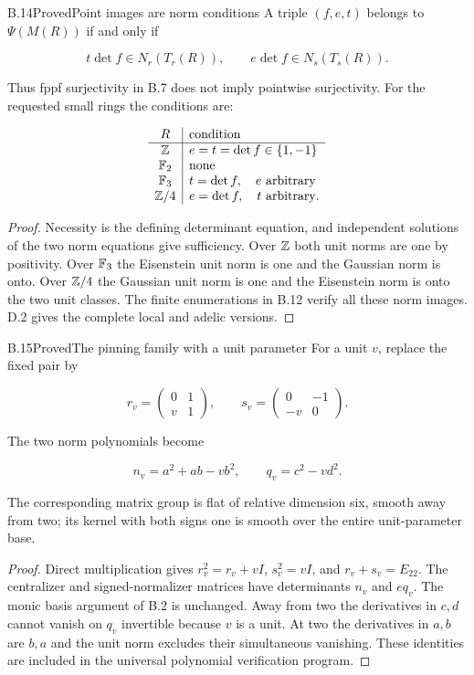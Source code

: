 \begin{statement}{B.14}{Proved}{Point images are norm conditions}
A triple $(f,e,t)$ belongs to $\Psi(M(R))$ if and only if

$$
t\det f\in N_r(T_r(R)),\qquad
 e\det f\in N_s(T_s(R)).
$$

Thus fppf surjectivity in B.7 does not imply pointwise
surjectivity. For the requested small rings the conditions are:

$$
\begin{array}{c|l}
R&\text{condition}\\\hline
\mathbb Z&e=t=\det f\in\{1,-1\}\\
\mathbb F_2&\text{none}\\
\mathbb F_3&t=\det f,\quad e\text{ arbitrary}\\
\mathbb Z/4&e=\det f,\quad t\text{ arbitrary}.
\end{array}
$$

\end{statement}
\begin{proof}
Necessity is the defining determinant equation, and independent
solutions of the two norm equations give sufficiency.
Over $\mathbb Z$ both unit norms are one by positivity.
Over $\mathbb F_3$ the Eisenstein unit norm is one and the Gaussian
norm is onto. Over $\mathbb Z/4$ the Gaussian unit norm is one and
the Eisenstein norm is onto the two unit classes.
The finite enumerations in B.12 verify all these norm images.
D.2 gives the complete local and adelic versions.
\end{proof}

\begin{statement}{B.15}{Proved}{The pinning family with a unit parameter}
For a unit $v$, replace the fixed pair by

$$
r_v=\begin{pmatrix}0&1\\v&1\end{pmatrix},\qquad
 s_v=\begin{pmatrix}0&-1\\-v&0\end{pmatrix}.
$$

The two norm polynomials become

$$
n_v=a^2+ab-vb^2,\qquad q_v=c^2-vd^2.
$$

The corresponding matrix group is flat of relative dimension
six, smooth away from two; its kernel with both signs one
is smooth over the entire unit-parameter base.
\end{statement}
\begin{proof}
Direct multiplication gives
$r_v^2=r_v+vI$, $s_v^2=vI$, and $r_v+s_v=E_{22}$.
The centralizer and signed-normalizer matrices have determinants
$n_v$ and $e q_v$. The monic basis argument of B.2 is unchanged.
Away from two the derivatives in $c,d$ cannot vanish on
$q_v$ invertible because $v$ is a unit.
At two the derivatives in $a,b$ are $b,a$ and the unit norm
excludes their simultaneous vanishing.
These identities are included in the universal polynomial
verification program.
\end{proof}

